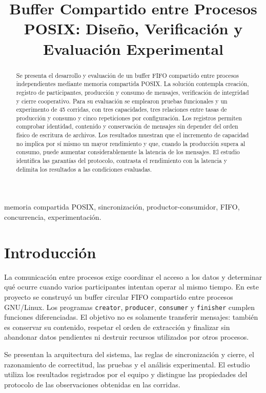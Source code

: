 \documentclass[conference]{IEEEtran}
\title{Buffer Compartido entre Procesos POSIX: Diseño, Verificación y Evaluación Experimental}
\author{\IEEEauthorblockN{Esteban Chaves Morera, Adrián Campos León y Edwin Loria Fonseca}
\IEEEauthorblockA{Maestría en Ciencias de la Computación\\Tecnológico de Costa Rica\\Sistemas Operativos Avanzados, II semestre de 2026}}
\begin{document}
\maketitle
\begin{abstract}
Se presenta el desarrollo y evaluación de un buffer FIFO compartido entre procesos independientes mediante memoria compartida POSIX. La solución contempla creación, registro de participantes, producción y consumo de mensajes, verificación de integridad y cierre cooperativo. Para su evaluación se emplearon pruebas funcionales y un experimento de 45 corridas, con tres capacidades, tres relaciones entre tasas de producción y consumo y cinco repeticiones por configuración. Los registros permiten comprobar identidad, contenido y conservación de mensajes sin depender del orden físico de escritura de archivos. Los resultados muestran que el incremento de capacidad no implica por sí mismo un mayor rendimiento y que, cuando la producción supera al consumo, puede aumentar considerablemente la latencia de los mensajes. El estudio identifica las garantías del protocolo, contrasta el rendimiento con la latencia y delimita los resultados a las condiciones evaluadas.
\end{abstract}
\begin{IEEEkeywords}
memoria compartida POSIX, sincronización, productor-consumidor, FIFO, concurrencia, experimentación.
\end{IEEEkeywords}

\section{Introducción}
La comunicación entre procesos exige coordinar el acceso a los datos y determinar qué ocurre cuando varios participantes intentan operar al mismo tiempo. En este proyecto se construyó un buffer circular FIFO compartido entre procesos GNU/Linux. Los programas \texttt{creator}, \texttt{producer}, \texttt{consumer} y \texttt{finisher} cumplen funciones diferenciadas. El objetivo no es solamente transferir mensajes: también es conservar su contenido, respetar el orden de extracción y finalizar sin abandonar datos pendientes ni destruir recursos utilizados por otros procesos.

Se presentan la arquitectura del sistema, las reglas de sincronización y cierre, el razonamiento de correctitud, las pruebas y el análisis experimental. El estudio utiliza los resultados registrados por el equipo y distingue las propiedades del protocolo de las observaciones obtenidas en las corridas.
\end{document}

